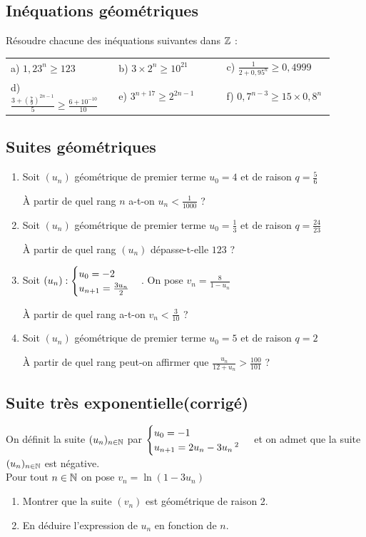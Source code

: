 \documentclass[oneside,12pt]{book}          %
\begin{document}
\subsection{Inéquations géométriques}
Résoudre chacune des inéquations suivantes dans ${\mathbb Z}$ :\\
\begin{tabular}{p{0.3\linewidth} p{0.3\linewidth} p{0.3\linewidth}}
a) $1, 23^n \geq 123$ & b) $3 \times 2^n \geq 10^{21}$ & c) $\frac{1}{2 + 0,95^n} \geq 0,4999$ \\ 
d) $\frac{3 + \left(\frac{7}{9}\right)^{2n-1}}{5} \geq \frac{6 + 10^{-10}}{10}$ & e) $3^{n+17} \geq 2^{2n-1}$ & f) $0,7^{n-3} \geq 15 \times 0,8^n$ \\
\end{tabular}



\subsection{Suites géométriques}
\begin{enumerate}
    \item Soit $(u_n)$ géométrique de premier terme $u_0 = 4$ et de raison $q = \frac{5}{6}$

    À partir de quel rang $n$ a-t-on $u_n < \frac{1}{1000}$ ?

    \item Soit $(u_n)$ géométrique de premier terme $u_0 = \frac{1}{3}$ et de raison $q = \frac{24}{23}$

    À partir de quel rang $(u_n)$ dépasse-t-elle $123$ ?

    \item Soit $(u_n):\defsuite{u_0=-2}{\frac{3u_n}{2}}$. On pose $v_n = \frac{8}{1 - u_n}$

    À partir de quel rang a-t-on $v_n < \frac{3}{10}$ ?

    \item Soit $(u_n)$ géométrique de premier terme $u_0 = 5$ et de raison $q = 2$

    À partir de quel rang peut-on affirmer que $\frac{u_n}{12 + u_n} > \frac{100}{101}$ ?
\end{enumerate}



\subsection{Suite très exponentielle\quad\small{(corrigé)}}
On définit la suite ${(u_{n})_{n\in\mathbb N}}$ par $\defsuite{u_0=-1}{2u_n-3u_n\,^2}$ et on admet que la suite ${(u_{n})_{n\in\mathbb N}}$ est négative. \\
Pour tout ${n\in\mathbb N}$ on pose $v_n=\ln(1-3u_n)$
\begin{enumerate}
	\item Montrer que la suite $(v_n)$ est géométrique de raison 2.
	\item En déduire l'expression de $u_n$ en fonction de $n$.
\end{enumerate}
\end{document}
